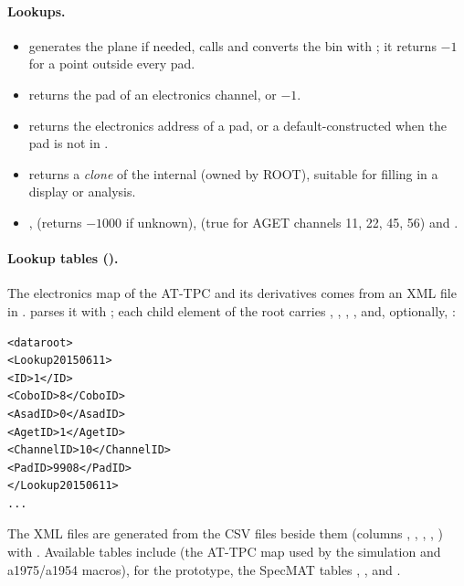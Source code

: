 \paragraph{Lookups.}
\begin{itemize}
  \item {} generates the plane if needed, calls  and
    converts the bin with ; it returns $-1$ for a point outside every pad.
  \item {} returns the pad of an electronics channel, or $-1$.
  \item {} returns the electronics address of a pad, or a default-constructed
     when the pad is not in .
  \item {} returns a \emph{clone} of the internal  (owned by ROOT),
    suitable for filling in a display or analysis.
  \item {},  (returns $-1000$ if unknown),
     (true for AGET channels 11, 22, 45, 56) and .
\end{itemize}

\paragraph{Lookup tables ().} The electronics map of the AT-TPC and its
derivatives comes from an XML file in .  parses it with
; each child element of the root carries , , ,
,  and, optionally, :
\begin{verbatim}
<dataroot>
<Lookup20150611>
<ID>1</ID>
<CoboID>8</CoboID>
<AsadID>0</AsadID>
<AgetID>1</AgetID>
<ChannelID>10</ChannelID>
<PadID>9908</PadID>
</Lookup20150611>
...
\end{verbatim}
The XML files are generated from the CSV files beside them (columns
, , , , ) with . Available tables include
 (the AT-TPC map used by the simulation and a1975/a1954 macros),
 for the prototype, the SpecMAT tables
,
,  and .

